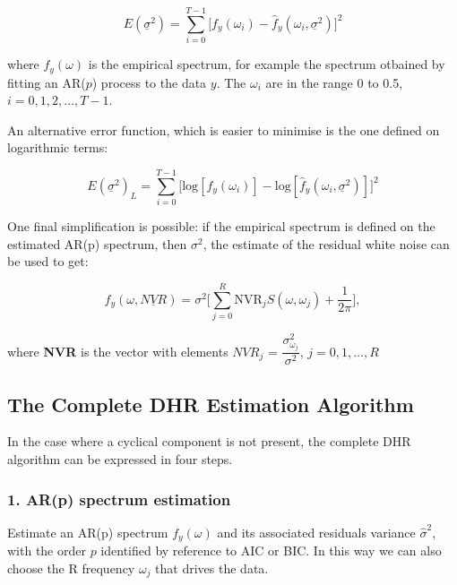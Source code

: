 \documentclass{article}\usepackage[]{graphicx}\usepackage[]{color}
\begin{document}
\begin{equation*}
E(\underline{\sigma}^2) = \sum_{i = 0}^{T - 1} \Big[ f_y(\omega_i) - \hat{f}_y(\omega_i,\underline{\sigma}^2) \Big]^2
\end{equation*}

where $f_y(\omega)$ is the empirical spectrum, for example the spectrum otbained by fitting an AR($p$) process to the data $y$. The $\omega_i$ are in the range 0 to 0.5, $i = 0, 1, 2, \dots, T - 1$.



An alternative error function, which is easier to minimise is the one defined on logarithmic terms:

\begin{equation*}
E(\underline{\sigma}^2)_{L} = \sum_{i = 0}^{T - 1} \Big[ \text{log}[f_y(\omega_i)] - \text{log}[\hat{f}_y(\omega_i,\underline{\sigma}^2)] \Big]^2
\end{equation*}

One final simplification is possible: if the empirical spectrum is defined on the estimated AR(p) spectrum, then $\sigma^2$, the estimate of the residual white noise can be used to get:


\begin{equation*}
f_y(\omega, \underline{NVR}) = \sigma^2 \Big[ \sum_{j = 0}^{R} \text{NVR}_j S(\omega, \omega_j) + \frac{1}{2 \pi} \Big],
\end{equation*}

where \textbf{NVR} is the vector with elements $NVR_j$ = $\dfrac{\sigma^2_{\omega_j}}{\sigma^2}$, $j = 0, 1, \dots, R$

\vspace{0.5cm}


\subsection*{The Complete DHR Estimation Algorithm }
In the case where a cyclical component is not present, the complete DHR algorithm can be expressed in four steps.

\subsubsection*{1. AR(p) spectrum estimation}
Estimate an AR(p) spectrum $f_y(\omega)$ and its associated residuals variance $\hat{\sigma}^2$, with the order $p$ identified by reference to AIC or BIC. In this way we can also choose the R frequency $\omega_j$ that drives the data.
\end{document}
